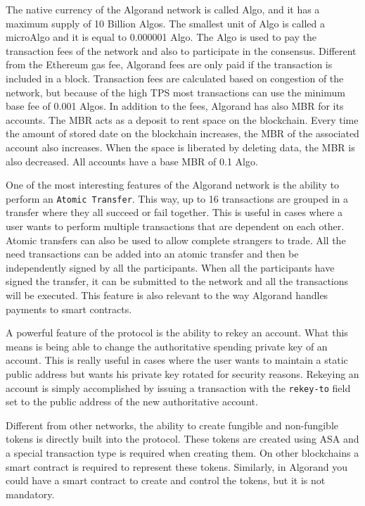 The native currency of the Algorand network is called Algo, and it has a maximum supply of 10 Billion Algos. The smallest unit of Algo is called a microAlgo and it is equal to 0.000001 Algo. The Algo is used to pay the transaction fees of the network and also to participate in the consensus. Different from the Ethereum gas fee, Algorand fees are only paid if the transaction is included in a block. Transaction fees are calculated based on congestion of the network, but because of the high TPS most transactions can use the minimum base fee of 0.001 Algos. In addition to the fees, Algorand has also \ac{MBR} for its accounts. The \ac{MBR} acts as a deposit to rent space on the blockchain. Every time the amount of stored date on the blockchain increases, the \ac{MBR} of the associated account also increases. When the space is liberated by deleting data, the \ac{MBR} is also decreased. All accounts have a base \ac{MBR} of 0.1 Algo.

One of the most interesting features of the Algorand network is the ability to perform an \texttt{Atomic Transfer}. This way, up to 16 transactions are grouped in a transfer where they all succeed or fail together. This is useful in cases where a user wants to perform multiple transactions that are dependent on each other. Atomic transfers can also be used to allow complete strangers to trade. All the need transactions can be added into an atomic transfer and then be independently signed by all the participants. When all the participants have signed the transfer, it can be submitted to the network and all the transactions will be executed. This feature is also relevant to the way Algorand handles payments to smart contracts.

A powerful feature of the protocol is the ability to rekey an account. What this means is being able to change the authoritative spending private key of an account. This is really useful in cases where the user wants to maintain a static public address but wants his private key rotated for security reasons. Rekeying an account is simply accomplished by issuing a transaction with the \texttt{rekey-to} field set to the public address of the new authoritative account.

Different from other networks, the ability to create fungible and non-fungible tokens is directly built into the protocol. These tokens are created using \ac{ASA} and a special transaction type is required when creating them. On other blockchains a smart contract is required to represent these tokens. Similarly, in Algorand you could have a smart contract to create and control the tokens, but it is not mandatory.

